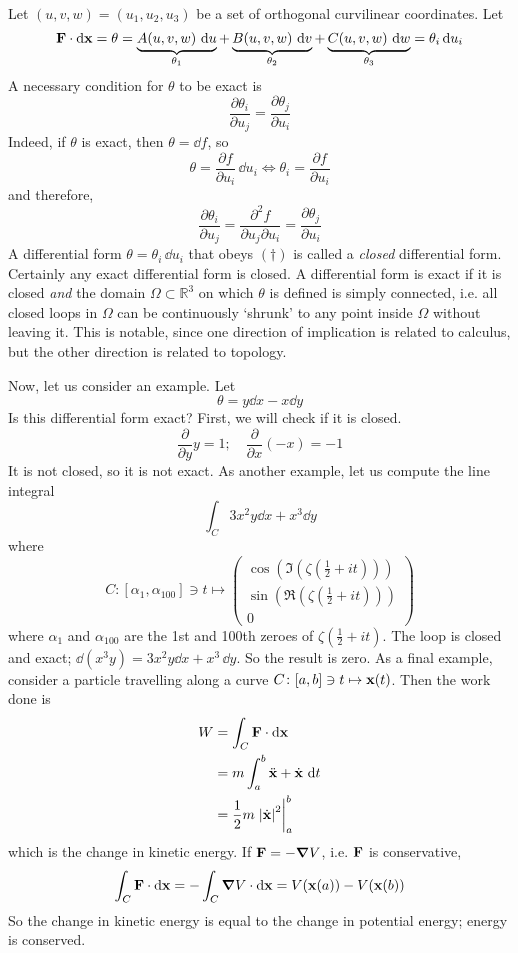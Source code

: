 \documentclass{article}
\begin{document}
Let $(u, v, w) = (u_1, u_2, u_3)$ be a set of orthogonal curvilinear coordinates. Let
\[ \vb F \cdot \dd \vb x = \theta = \underbrace{A(u, v, w) \, \dd{u}}_{\theta_1} + \underbrace{B(u, v, w) \, \dd{v}}_{\theta_2} + \underbrace{C(u, v, w) \, \dd{w}}_{\theta_3} = \theta_i \dd{u}_i \]
A necessary condition for $\theta$ to be exact is
\begin{equation}
    \frac{\partial \theta_i}{\partial u_j} = \frac{\partial \theta_j}{\partial u_i}
    \tag{$\dagger$}
\end{equation}
Indeed, if $\theta$ is exact, then $\theta = \dd{f}$, so
\[ \theta = \frac{\partial f}{\partial u_i} \, \dd{u}_i \iff \theta_i = \frac{\partial f}{\partial u_i} \]
and therefore,
\[ \frac{\partial \theta_i}{\partial u_j} = \frac{\partial^2 f}{\partial u_j \partial u_i} = \frac{\partial \theta_j}{\partial u_i} \]
A differential form $\theta = \theta_i \, \dd{u}_i$ that obeys $(\dagger)$ is called a \textit{closed} differential form. Certainly any exact differential form is closed. A differential form is exact if it is closed \textit{and} the domain $\Omega \subset \mathbb R^3$ on which $\theta$ is defined is simply connected, i.e. all closed loops in $\Omega$ can be continuously `shrunk' to any point inside $\Omega$ without leaving it. This is notable, since one direction of implication is related to calculus, but the other direction is related to topology.

Now, let us consider an example. Let
\[ \theta = y \dd{x} - x \dd{y} \]
Is this differential form exact? First, we will check if it is closed.
\[ \frac{\partial}{\partial y} y = 1;\quad \frac{\partial}{\partial x} (-x) = -1 \]
It is not closed, so it is not exact. As another example, let us compute the line integral
\[ \int_C 3x^2y\dd{x} + x^3\dd{y} \]
where
\[ C \colon [\alpha_1, \alpha_{100}] \ni t \mapsto \begin{pmatrix}
        \cos \left( \Im \left( \zeta \left( \frac{1}{2} + it \right) \right) \right) \\
        \sin \left( \Re \left( \zeta \left( \frac{1}{2} + it \right) \right) \right) \\
        0
    \end{pmatrix} \]
where $\alpha_1$ and $\alpha_{100}$ are the 1st and 100th zeroes of $\zeta \left( \frac{1}{2} + it \right)$. The loop is closed and exact; $\dd(x^3 y) = 3x^2 y \dd{x} + x^3 \, \dd{y}$. So the result is zero. As a final example, consider a particle travelling along a curve $C \colon [a, b] \ni t \mapsto \vb x(t)$. Then the work done is
\begin{align*}
    W & = \int_C \vb F \cdot \dd \vb x                    \\
      & = m \int_a^b \ddot{\vb x} + \dot{\vb x} \, \dd{t} \\
      & = \frac{1}{2}m \eval{\abs{\dot{\vb x}}^2}_a^b
\end{align*}
which is the change in kinetic energy. If $\vb F = -\grad V$, i.e. $\vb F$ is conservative,
\[ \int_C \vb F \cdot \dd \vb x = -\int_C \grad V \cdot \dd \vb x = V(\vb x(a)) - V(\vb x(b)) \]
So the change in kinetic energy is equal to the change in potential energy; energy is conserved.
\end{document}
